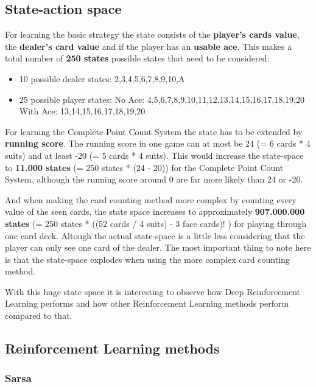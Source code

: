 \documentclass[conference]{IEEEtran}
\begin{document}
\subsection{State-action space}
For learning the basic strategy the state consists of the \textbf{player's cards value}, the \textbf{dealer's card value} and if the player has an \textbf{usable ace}. 
This makes a total number of \textbf{250 states} possible states that need to be considered:
\begin{itemize}
	\item 10 possible dealer states: 2,3,4,5,6,7,8,9,10,A
	\item 25 possible player states:
		\subitem No Ace: 4,5,6,7,8,9,10,11,12,13,14,15,16,17,18,19,20
		\subitem With Ace: 13,14,15,16,17,18,19,20
\end{itemize}

For learning the Complete Point Count System the state has to be extended by \textbf{running score}.
The running score in one game can at most be 24 (= 6 cards * 4 suits) and at least -20 (= 5 cards * 4 suits).
This would increase the state-space to \textbf{11.000 states} (= 250 states * (24 - 20)) for the Complete Point Count System, although the running score around 0 are far more likely than 24 or -20.

And when making the card counting method more complex by counting every value of the seen cards, the state space increases to approximately \textbf{907.000.000 states} (= 250 states * ((52 cards / 4 suits) - 3 face cards)! ) for playing through one card deck.  
Altough the actual state-space is a little less considering that the player can only see one card of the dealer.
The most important thing to note here is that the state-space explodes when using the more complex card counting method. 

With this huge state space it is interesting to observe how Deep Reinforcement Learning performs and how other Reinforcement Learning methods perform compared to that. 


\subsection{Reinforcement Learning methods}
\subsubsection{Sarsa}
\end{document}
